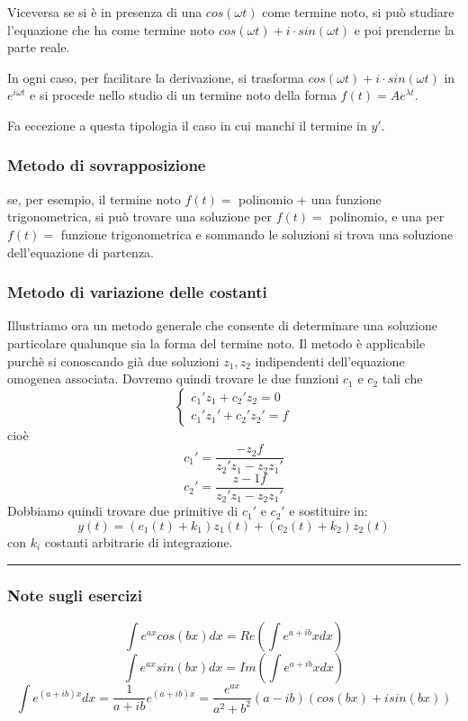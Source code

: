 \begin{itemize}
    Viceversa se si è in presenza di una $cos(\omega t)$ come termine noto, si può studiare l'equazione che ha come termine noto $cos(\omega t) + i \cdot sin(\omega t)$ e poi prenderne la parte reale.\newline
    \begin{tcolorbox}
        In ogni caso, per facilitare la derivazione, si trasforma $cos(\omega t) + i \cdot sin(\omega t)$ in $e^{i\omega t}$ e si procede nello studio di un termine noto della forma $f(t) = Ae^{\lambda t}$.
    \end{tcolorbox}
    Fa eccezione a questa tipologia il caso in cui manchi il termine in $y'$.\newline
    \newline
\end{itemize}
\subsubsection{Metodo di sovrapposizione}
\begin{tcolorbox}
se, per esempio, il termine noto $f(t) =$ polinomio $+$ una funzione trigonometrica, si può trovare una soluzione per $f(t) =$ polinomio, e una per $f(t) =$ funzione trigonometrica e sommando le soluzioni si trova una soluzione dell'equazione di partenza.
\end{tcolorbox}
\subsubsection{Metodo di variazione delle costanti}
Illustriamo ora un metodo generale che consente di determinare una soluzione particolare qualunque sia la forma del termine noto.\newline
Il metodo è applicabile purchè si conoscando già due soluzioni $z_1, z_2$ indipendenti dell'equazione omogenea associata.\newline
Dovremo quindi trovare le due funzioni $c_1$ e $c_2$ tali che
\[
    \begin{cases}
        c_1'z_1 + c_2'z_2 = 0 \\
        c_1'z_1' + c_2' z_2' = f
    \end{cases}
\]
cioè
\[
    c_1' = \frac{-z_2 f}{z_2'z_1 - z_2 z_1'}
\]
\[
    c_2' = \frac{z-1 f}{z_2'z_1 - z_2 z_1'}
\]
Dobbiamo quindi trovare due primitive di $c_1'$ e $c_2'$ e sostituire in:
\[
    y(t) =(c_1(t)+ k_1)z_1(t) + (c_2(t)+k_2)z_2(t)
\]
con $k_i$ costanti arbitrarie di integrazione.\newline
\rule{\textwidth}{0,4pt}
\subsubsection{Note sugli esercizi}
\[
    \int e^{ax}cos(bx) dx = Re (\int e^{a+ib}x dx ) 
\]
\[
    \int e^{ax}sin(bx) dx = Im (\int e^{a+ib}x dx ) 
\]
\[
    \int e^{(a+ib)x} dx = \frac{1}{a+ib}e^{(a+ib)x} = \frac{e^{ax}}{a^2+b^2} (a-ib)(cos(bx) + i sin(bx))
\]
